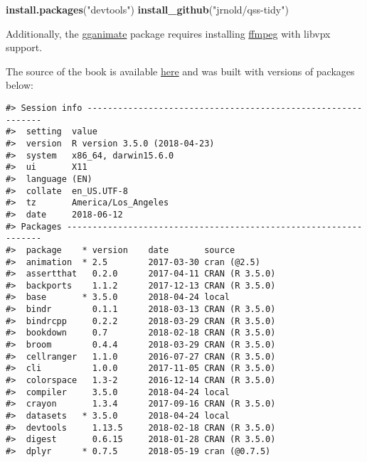 \documentclass[]{book}
\newenvironment{Shaded}{\begin{snugshade}}{\end{snugshade}}
\newcommand{\KeywordTok}[1]{\textcolor[rgb]{0.13,0.29,0.53}{\textbf{#1}}}
\newcommand{\StringTok}[1]{\textcolor[rgb]{0.31,0.60,0.02}{#1}}
\newcommand{\NormalTok}[1]{#1}
\theoremstyle{definition}
\theoremstyle{definition}
\theoremstyle{definition}
\theoremstyle{remark}
\begin{document}
\begin{Shaded}
\begin{Highlighting}[]
\KeywordTok{install.packages}\NormalTok{(}\StringTok{"devtools"}\NormalTok{)}
\KeywordTok{install_github}\NormalTok{(}\StringTok{"jrnold/qss-tidy"}\NormalTok{)}
\end{Highlighting}
\end{Shaded}

Additionally, the
\href{https://cran.r-project.org/package=gganimate}{gganimate} package
requires installing \href{https://ffmpeg.org/}{ffmpeg} with libvpx
support.

The source of the book is available
\href{https://github.com/jrnold/qsstidy}{here} and was built with
versions of packages below:

\begin{verbatim}
#> Session info -------------------------------------------------------------
#>  setting  value                       
#>  version  R version 3.5.0 (2018-04-23)
#>  system   x86_64, darwin15.6.0        
#>  ui       X11                         
#>  language (EN)                        
#>  collate  en_US.UTF-8                 
#>  tz       America/Los_Angeles         
#>  date     2018-06-12
#> Packages -----------------------------------------------------------------
#>  package    * version    date       source                            
#>  animation  * 2.5        2017-03-30 cran (@2.5)                       
#>  assertthat   0.2.0      2017-04-11 CRAN (R 3.5.0)                    
#>  backports    1.1.2      2017-12-13 CRAN (R 3.5.0)                    
#>  base       * 3.5.0      2018-04-24 local                             
#>  bindr        0.1.1      2018-03-13 CRAN (R 3.5.0)                    
#>  bindrcpp     0.2.2      2018-03-29 CRAN (R 3.5.0)                    
#>  bookdown     0.7        2018-02-18 CRAN (R 3.5.0)                    
#>  broom        0.4.4      2018-03-29 CRAN (R 3.5.0)                    
#>  cellranger   1.1.0      2016-07-27 CRAN (R 3.5.0)                    
#>  cli          1.0.0      2017-11-05 CRAN (R 3.5.0)                    
#>  colorspace   1.3-2      2016-12-14 CRAN (R 3.5.0)                    
#>  compiler     3.5.0      2018-04-24 local                             
#>  crayon       1.3.4      2017-09-16 CRAN (R 3.5.0)                    
#>  datasets   * 3.5.0      2018-04-24 local                             
#>  devtools     1.13.5     2018-02-18 CRAN (R 3.5.0)                    
#>  digest       0.6.15     2018-01-28 CRAN (R 3.5.0)                    
#>  dplyr      * 0.7.5      2018-05-19 cran (@0.7.5)                     

\end{verbatim}
\end{document}
